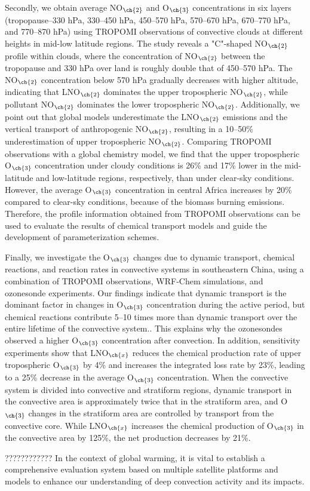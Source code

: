 {Secondly, we obtain average NO$_{\ch{2}}$ and O$_{\ch{3}}$ concentrations in six layers (tropopause--330 hPa, 330--450 hPa, 450--570 hPa, 570--670 hPa, 670--770 hPa, and 770--870 hPa) using TROPOMI observations of convective clouds at different heights in mid-low latitude regions.
The study reveals a "C"-shaped NO$_{\ch{2}}$ profile within clouds, where the concentration of NO$_{\ch{2}}$ between the tropopause and 330 hPa over land is roughly double that of 450--570 hPa.
The NO$_{\ch{2}}$ concentration below 570 hPa gradually decreases with higher altitude, indicating that LNO$_{\ch{2}}$ dominates the upper tropospheric NO$_{\ch{2}}$, while pollutant NO$_{\ch{2}}$ dominates the lower tropospheric NO$_{\ch{2}}$.
Additionally, we point out that global models underestimate the LNO$_{\ch{2}}$ emissions and the vertical transport of anthropogenic NO$_{\ch{2}}$, resulting in a 10--50\% underestimation of upper tropospheric NO$_{\ch{2}}$.
Comparing TROPOMI observations with a global chemistry model, we find that the upper tropospheric O$_{\ch{3}}$ concentration under cloudy conditions is 26\% and 17\% lower in the mid-latitude and low-latitude regions, respectively, than under clear-sky conditions.
However, the average O$_{\ch{3}}$ concentration in central Africa increases by 20\% compared to clear-sky conditions, because of the biomass burning emissions.
Therefore, the profile information obtained from TROPOMI observations can be used to evaluate the results of chemical transport models and guide the development of parameterization schemes.

Finally, we investigate the O$_{\ch{3}}$ changes due to dynamic transport, chemical reactions, and reaction rates in convective systems in southeastern China, using a combination of TROPOMI observations, WRF-Chem simulations, and ozonesonde experiments.
Our findings indicate that dynamic transport is the dominant factor in changes in O$_{\ch{3}}$ concentration during the active period,
but chemical reactions contribute 5--10 times more than dynamic transport over the entire lifetime of the convective system..
This explains why the ozonesondes observed a higher O$_{\ch{3}}$ concentration after convection.
In addition, sensitivity experiments show that LNO$_{\ch{x}}$ reduces the chemical production rate of upper tropospheric O$_{\ch{3}}$ by 4\% and increases the integrated loss rate by 23\%,
leading to a 25\% decrease in the average O$_{\ch{3}}$ concentration.
When the convective system is divided into convective and stratiform regions,
dynamic transport in the convective area is approximately twice that in the stratiform area,
and O$_{\ch{3}}$ changes in the stratiform area are controlled by transport from the convective core.
While LNO$_{\ch{x}}$ increases the chemical production of O$_{\ch{3}}$ in the convective area by 125\%, the net production decreases by 21\%.

????????????
In the context of global warming, it is vital to establish a comprehensive evaluation system based on multiple satellite platforms and models to enhance our understanding of deep convection activity and its impacts.
}
